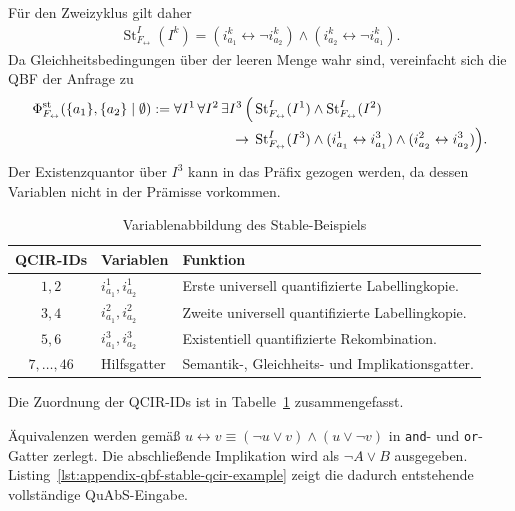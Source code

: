 \begin{Example}
Für den Zweizyklus gilt daher
\[
\begin{split}
    \operatorname{St}^{I}_{F_{\leftrightarrow}}(I^k)
    =
    (i_{a_1}^k\leftrightarrow\neg i_{a_2}^k)
    \land
    (i_{a_2}^k\leftrightarrow\neg i_{a_1}^k).
\end{split}
\]
Da Gleichheitsbedingungen über der leeren Menge wahr sind, vereinfacht
sich die QBF der Anfrage zu
\[
\begin{split}
    \Phi^{\mathrm{st}}_{F_{\leftrightarrow}}
        (\{a_1\},\{a_2\}\mid\emptyset)
    :=
    \forall I^1\,\forall I^2\,\exists I^3\,
    \Bigl(
        &\operatorname{St}^{I}_{F_{\leftrightarrow}}(I^1)
        \land
        \operatorname{St}^{I}_{F_{\leftrightarrow}}(I^2)
        \\
        {}\rightarrow{}&
        \operatorname{St}^{I}_{F_{\leftrightarrow}}(I^3)
        \land
        (i_{a_1}^1\leftrightarrow i_{a_1}^3)
        \land
        (i_{a_2}^2\leftrightarrow i_{a_2}^3)
    \Bigr).
\end{split}
\]
Der Existenzquantor über \(I^3\) kann in das Präfix gezogen werden, da
dessen Variablen nicht in der Prämisse vorkommen.
\begin{table}[H]
    \centering
    \begin{tabularx}{\textwidth}{@{}clX@{}}
        \toprule
        QCIR-IDs & Variablen & Funktion\\
        \midrule
        \(1,2\)
            & \(i_{a_1}^1,i_{a_2}^1\)
            & Erste universell quantifizierte Labellingkopie.\\
        \(3,4\)
            & \(i_{a_1}^2,i_{a_2}^2\)
            & Zweite universell quantifizierte Labellingkopie.\\
        \(5,6\)
            & \(i_{a_1}^3,i_{a_2}^3\)
            & Existentiell quantifizierte Rekombination.\\
        \(7,\ldots,46\)
            & Hilfsgatter
            & Semantik-, Gleichheits- und Implikationsgatter.\\
        \bottomrule
    \end{tabularx}
    \caption{Variablenabbildung des Stable-Beispiels}
    \label{tab:appendix-qbf-stable-variables}
\end{table}
Die Zuordnung der QCIR-IDs ist in
Tabelle~\ref{tab:appendix-qbf-stable-variables} zusammengefasst.

Äquivalenzen werden gemäß
\(
    u\leftrightarrow v
    \equiv
    (\neg u\lor v)\land(u\lor\neg v)
\)
in \texttt{and}- und \texttt{or}-Gatter zerlegt. Die abschließende
Implikation wird als \(\neg A\lor B\) ausgegeben.
Listing~\ref{lst:appendix-qbf-stable-qcir-example} zeigt die dadurch
entstehende vollständige QuAbS-Eingabe.


\end{Example}
